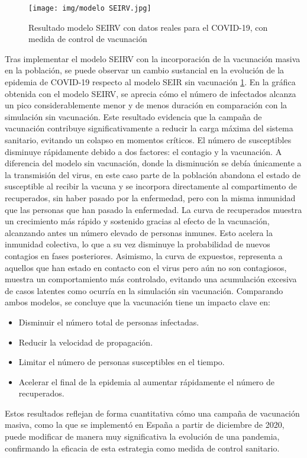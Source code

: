 \begin{figure}[H]
    \centering
    \texttt{[image: img/modelo SEIRV.jpg]}
    \caption{Resultado modelo SEIRV con datos reales para el COVID-19, con medida de control de vacunación}
    \label{fig:Simucov vacunacion}
    \vspace{0.5cm} %
\end{figure}

Tras implementar el modelo SEIRV con la incorporación de la vacunación masiva en la población, se puede observar un cambio sustancial en la evolución de la epidemia de COVID-19 respecto al modelo SEIR sin vacunación \ref{fig:Simucov vacunacion}.
En la gráfica obtenida con el modelo SEIRV, se aprecia cómo el número de infectados alcanza un pico considerablemente menor y de menos duración en comparación con la simulación sin vacunación. Este resultado evidencia que la campaña de vacunación contribuye significativamente a reducir la carga máxima del sistema sanitario, evitando un colapso en momentos críticos.
El número de susceptibles disminuye rápidamente debido a dos factores: el contagio y la vacunación. A diferencia del modelo sin vacunación, donde la disminución se debía únicamente a la transmisión del virus, en este caso parte de la población abandona el estado de susceptible al recibir la vacuna y se incorpora directamente al compartimento de recuperados, sin haber pasado por la enfermedad, pero con la misma inmunidad que las personas que han pasado la enfermedad.
La curva de recuperados muestra un crecimiento más rápido y sostenido gracias al efecto de la vacunación, alcanzando antes un número elevado de personas inmunes. Esto acelera la inmunidad colectiva, lo que a su vez disminuye la probabilidad de nuevos contagios en fases posteriores.
Asimismo, la curva de expuestos, representa a aquellos que han estado en contacto con el virus pero aún no son contagiosos, muestra un comportamiento más controlado, evitando una acumulación excesiva de casos latentes como ocurría en la simulación sin vacunación.
Comparando ambos modelos, se concluye que la vacunación tiene un impacto clave en:
\begin{itemize}
    \item Disminuir el número total de personas infectadas.
    \item Reducir la velocidad de propagación.
    \item Limitar el número de personas susceptibles en el tiempo.
    \item Acelerar el final de la epidemia al aumentar rápidamente el número de recuperados.
\end{itemize}	
Estos resultados reflejan de forma cuantitativa cómo una campaña de vacunación masiva, como la que se implementó en España a partir de diciembre de 2020, puede modificar de manera muy significativa la evolución de una pandemia, confirmando la eficacia de esta estrategia como medida de control sanitario.







